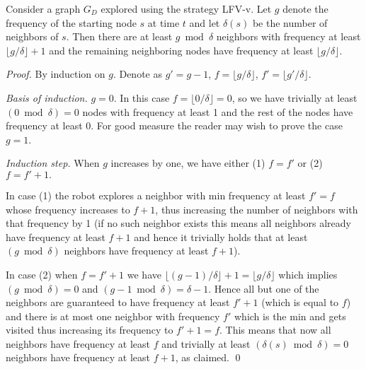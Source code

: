 \begin{lemma}
Consider a graph $G_D$ explored using the
strategy LFV-v. Let $g$ denote the frequency of the starting node $s$ at time $t$
and let $\delta(s)$ be the number of neighbors of $s$. Then there are at least $g\bmod \delta$
neighbors with frequency at least $\lfloor g/\delta\rfloor +1$ and the remaining
neighboring nodes have frequency at least $\lfloor g/\delta\rfloor$.
\end{lemma}
\begin{proof}
By induction on $g$. Denote as $g'=g-1$, $f=\lfloor g/\delta\rfloor$,
$f'=\lfloor g'/\delta\rfloor$.

\noindent \emph{Basis of induction.} $g=0.$ In this case $f=\lfloor 0/\delta\rfloor=0$, so we have
trivially at least $(0 \bmod \delta) =0$ nodes with frequency at least 1 and the rest of the nodes have frequency at least 0.
For good measure the reader may wish to prove the case $g=1$.


\noindent \emph{Induction step.} When $g$ increases by one, we have either (1) $f=f'$
or (2) $f=f'+1.$

\noindent In case (1) the robot explores a neighbor with min frequency at
least $f'=f$ whose frequency increases to $f+1$, thus increasing the
number of neighbors with that frequency by 1 (if no such neighbor
exists this means all neighbors already have frequency at least $f+1$
and hence it trivially holds that at least $(g \bmod \delta)$ neighbors have
frequency at least $f+1$).

\noindent In case (2) when $f=f'+1$ we have $\lfloor(g-1)/\delta\rfloor+1=\lfloor g/\delta\rfloor$ which
implies $(g \bmod \delta) = 0$ and $(g-1 \bmod \delta) = \delta-1$. Hence all but one
of the neighbors are guaranteed to have frequency at least $f'+1$
(which is equal to $f$) and there is at most one neighbor with frequency
$f'$ which is the min and gets visited thus increasing its frequency
to $f'+1=f$. This means that now all neighbors have frequency at least $f$
and trivially at least $(\delta(s) \bmod \delta)=0$ neighbors have frequency at
least $f+1$, as claimed.
\qed
\end{proof}

